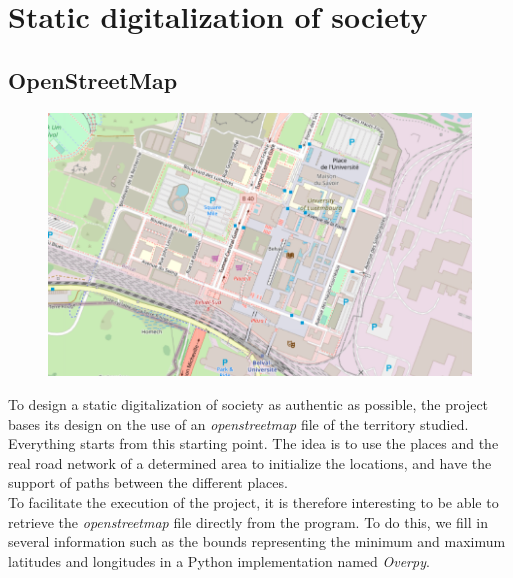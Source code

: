 \chapter{Static digitalization of society}

\section{OpenStreetMap}

\begin{figure}[h]
  \centering
  \includegraphics[width=0.8\linewidth]{Media/BelvalOSM.png}
  \caption{}
  \label{fig:belvalosm}
\end{figure}

To design a static digitalization of society as authentic as possible, the project bases its design on the use of an \textit{openstreetmap} file of the territory studied. Everything starts from this starting point. The idea is to use the places and the real road network of a determined area to initialize the locations, and have the support of paths between the different places.\\

To facilitate the execution of the project, it is therefore interesting to be able to retrieve the \textit{openstreetmap} file directly from the program. To do this, we fill in several information such as the bounds representing the minimum and maximum latitudes and longitudes in a Python implementation named \textit{Overpy}.\\

